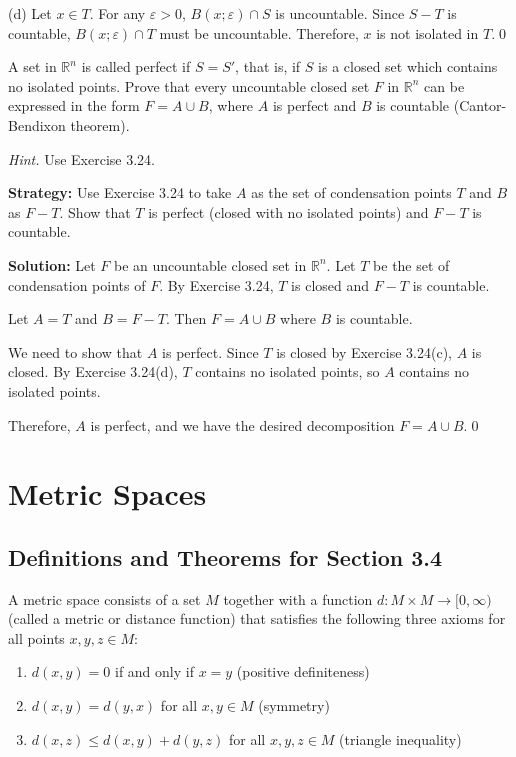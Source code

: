 (d) Let $x \in T$. For any $\varepsilon > 0$, $B(x;\varepsilon) \cap S$ is uncountable. Since $S - T$ is countable, $B(x;\varepsilon) \cap T$ must be uncountable. Therefore, $x$ is not isolated in $T$.\qed


\begin{problembox}
\begin{problemstatement}
A set in \( \mathbb{R}^n \) is called perfect if \( S = S' \), that is, if \( S \) is a closed set which contains no isolated points. Prove that every uncountable closed set \( F \) in \( \mathbb{R}^n \) can be expressed in the form \( F = A \cup B \), where \( A \) is perfect and \( B \) is countable (Cantor-Bendixon theorem).

\textit{Hint.} Use Exercise 3.24.
\end{problemstatement}
\end{problembox}

\noindent\textbf{Strategy:} Use Exercise 3.24 to take $A$ as the set of condensation points $T$ and $B$ as $F-T$. Show that $T$ is perfect (closed with no isolated points) and $F-T$ is countable.

\bigskip\noindent\textbf{Solution:} Let $F$ be an uncountable closed set in $\mathbb{R}^n$. Let $T$ be the set of condensation points of $F$. By Exercise 3.24, $T$ is closed and $F - T$ is countable.

Let $A = T$ and $B = F - T$. Then $F = A \cup B$ where $B$ is countable.

We need to show that $A$ is perfect. Since $T$ is closed by Exercise 3.24(c), $A$ is closed. By Exercise 3.24(d), $T$ contains no isolated points, so $A$ contains no isolated points.

Therefore, $A$ is perfect, and we have the desired decomposition $F = A \cup B$.\qed
\section{Metric Spaces}

\subsection*{Definitions and Theorems for Section 3.4}

\begin{definition}
A metric space consists of a set $M$ together with a function $d: M \times M \to [0,\infty)$ (called a metric or distance function) that satisfies the following three axioms for all points $x, y, z \in M$:
\begin{enumerate}
\item $d(x,y) = 0$ if and only if $x = y$ (positive definiteness)
\item $d(x,y) = d(y,x)$ for all $x,y \in M$ (symmetry)
\item $d(x,z) \leq d(x,y) + d(y,z)$ for all $x,y,z \in M$ (triangle inequality)
\end{enumerate}
\end{definition}

